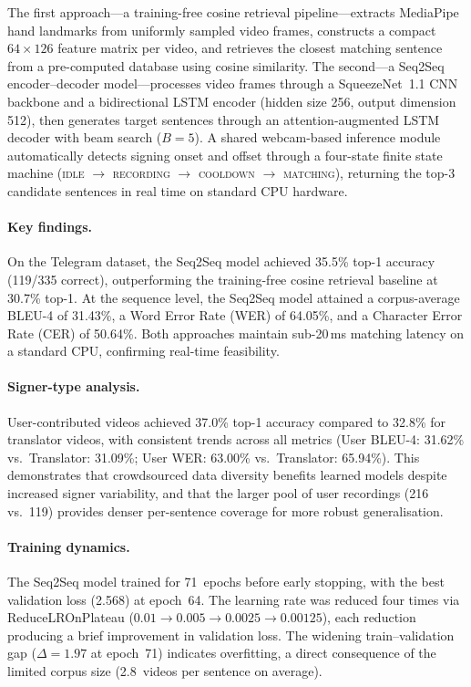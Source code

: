 \documentclass[runningheads]{llncs}
\begin{document}
The first approach—a training-free cosine retrieval pipeline—extracts
MediaPipe hand landmarks from uniformly sampled video frames,
constructs a compact $64 \times 126$ feature matrix per video, and
retrieves the closest matching sentence from a pre-computed database
using cosine similarity.
The second—a Seq2Seq encoder--decoder model—processes video frames
through a SqueezeNet~1.1 CNN backbone and a bidirectional LSTM
encoder (hidden size 256, output dimension 512), then generates
target sentences through an attention-augmented LSTM decoder with
beam search ($B = 5$).
A shared webcam-based inference module automatically detects signing
onset and offset through a four-state finite state machine
(\textsc{idle} $\rightarrow$ \textsc{recording} $\rightarrow$
\textsc{cooldown} $\rightarrow$ \textsc{matching}),
returning the top-3 candidate sentences in real time on standard
CPU hardware.

\paragraph{Key findings.}
On the Telegram dataset, the Seq2Seq model achieved 35.5\% top-1
accuracy (119/335 correct), outperforming the training-free cosine
retrieval baseline at 30.7\% top-1.
At the sequence level, the Seq2Seq model attained a corpus-average
BLEU-4 of 31.43\%, a Word Error Rate (WER) of 64.05\%, and a
Character Error Rate (CER) of 50.64\%.
Both approaches maintain sub-20\,ms matching latency on a standard
CPU, confirming real-time feasibility.

\paragraph{Signer-type analysis.}
User-contributed videos achieved 37.0\% top-1 accuracy compared to
32.8\% for translator videos, with consistent trends across all
metrics (User BLEU-4: 31.62\% vs.\ Translator: 31.09\%; User WER:
63.00\% vs.\ Translator: 65.94\%).
This demonstrates that crowdsourced data diversity benefits learned
models despite increased signer variability, and that the larger
pool of user recordings (216 vs.\ 119) provides denser per-sentence
coverage for more robust generalisation.

\paragraph{Training dynamics.}
The Seq2Seq model trained for 71~epochs before early stopping, with
the best validation loss (2.568) at epoch~64.
The learning rate was reduced four times via ReduceLROnPlateau
($0.01 \rightarrow 0.005 \rightarrow 0.0025 \rightarrow 0.00125$),
each reduction producing a brief improvement in validation loss.
The widening train--validation gap ($\Delta = 1.97$ at epoch~71)
indicates overfitting, a direct consequence of the limited corpus
size (2.8~videos per sentence on average).
\end{document}

